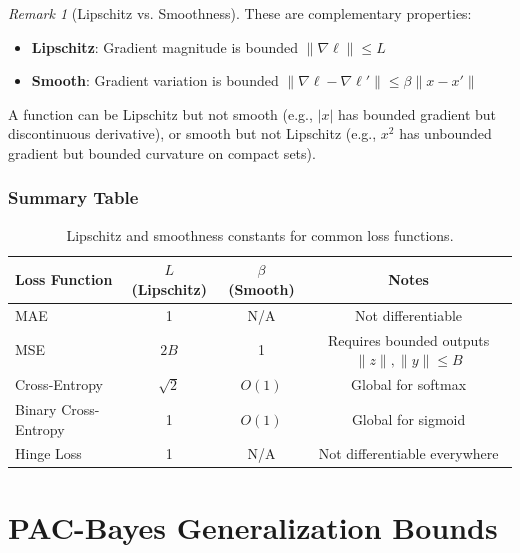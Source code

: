 \documentclass{article}
\theoremstyle{plain}
\theoremstyle{definition}
\theoremstyle{remark}
\newtheorem{remark}[theorem]{Remark}
\begin{document}
\begin{remark}[Lipschitz vs. Smoothness]
These are complementary properties:
\begin{itemize}
    \item \textbf{Lipschitz}: Gradient magnitude is bounded $\|\nabla \ell\| \leq L$
    \item \textbf{Smooth}: Gradient variation is bounded $\|\nabla \ell - \nabla \ell'\| \leq \beta\|x - x'\|$
\end{itemize}

A function can be Lipschitz but not smooth (e.g., $|x|$ has bounded gradient but discontinuous derivative), or smooth but not Lipschitz (e.g., $x^2$ has unbounded gradient but bounded curvature on compact sets).
\end{remark}

\subsubsection{Summary Table}

\begin{table}[H]
\centering
\caption{Lipschitz and smoothness constants for common loss functions.}
\label{tab:loss_constants}
\begin{tabular}{lccc}
\toprule
\textbf{Loss Function} & \textbf{$L$ (Lipschitz)} & \textbf{$\beta$ (Smooth)} & \textbf{Notes} \\
\midrule
MAE & 1 & N/A & Not differentiable \\
MSE & $2B$ & 1 & Requires bounded outputs $\|z\|, \|y\| \leq B$ \\

Cross-Entropy & $\sqrt{2}$ & $O(1)$ & Global for softmax \\
Binary Cross-Entropy & 1 & $O(1)$ & Global for sigmoid \\
Hinge Loss & 1 & N/A & Not differentiable everywhere \\
\bottomrule
\end{tabular}
\end{table}



\section{PAC-Bayes Generalization Bounds}\label{app:pacbayes}
\end{document}
